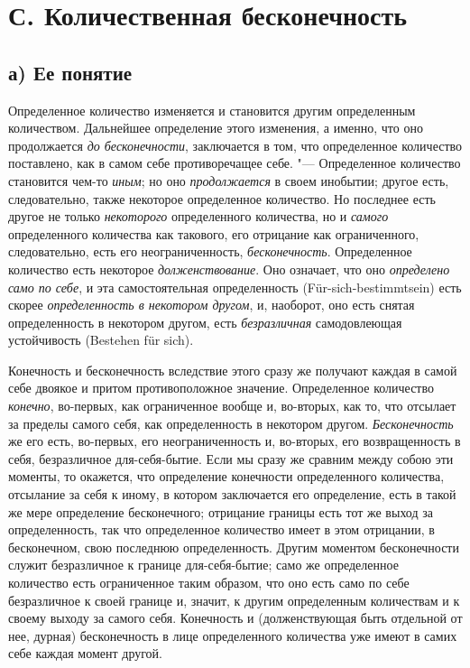 \section[С. Количественная бесконечность]{С. Количественная бесконечность}
\subsection[а) Ее понятие]{а) Ее понятие}

Определенное количество изменяется и становится другим определенным
количеством. Дальнейшее определение этого изменения, а именно, что оно
продолжается {\em до бесконечности}, заключается в том,
что определенное количество поставлено, как в самом себе противоречащее
себе. "--- Определенное количество становится чем-то
{\em иным}; но оно
{\em продолжается} в своем инобытии; другое есть,
следовательно, также некоторое определенное количество. Но последнее есть
другое не только {\em некоторого} определенного
количества, но и {\em самого} определенного количества
как такового, его отрицание как ограниченного, следовательно, есть его
неограниченность, {\em бесконечность}. Определенное
количество есть некоторое {\em долженствование}. Оно
означает, что оно {\em определено само по себе}, и эта
самостоятельная определенность (Für-sich-bestimmtsein) есть скорее
{\em определенность в некотором другом}, и, наоборот,
оно есть снятая определенность в некотором другом, есть
{\em безразличная} самодовлеющая устойчивость (Bestehen für sich).

Конечность и бесконечность вследствие этого сразу же получают каждая в самой
себе двоякое и притом противоположное значение. Определенное количество
{\em конечно}, во-первых, как ограниченное вообще и,
во-вторых, как то, что отсылает за пределы самого себя, как определенность
в некотором другом. {\em Бесконечность} же его есть,
во-первых, его неограниченность и, во-вторых, его возвращенность в себя,
безразличное для-себя-бытие. Если мы сразу же сравним между собою эти
моменты, то окажется, что определение конечности определенного количества,
отсылание за себя к иному, в котором заключается его
определение, есть в такой же мере определение бесконечного; отрицание
границы есть тот же выход за определенность, так что определенное
количество имеет в этом отрицании, в бесконечном, свою последнюю
определенность. Другим моментом бесконечности служит безразличное к границе
для-себя-бытие; само же определенное количество есть ограниченное таким
образом, что оно есть само по себе безразличное к своей границе и, значит,
к другим определенным количествам и к своему выходу за самого себя.
Конечность и (долженствующая быть отдельной от нее, дурная) бесконечность в
лице определенного количества уже имеют в самих себе каждая момент другой.

